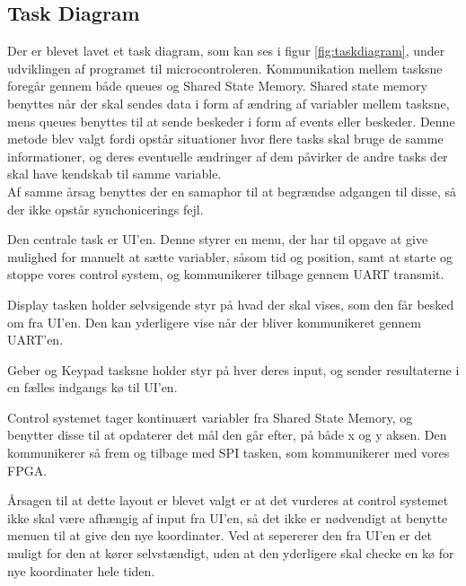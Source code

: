 \subsection{Task Diagram}

Der er blevet lavet et task diagram, som kan ses i figur \ref{fig:taskdiagram}, under udviklingen af programet til microcontroleren. Kommunikation mellem tasksne foregår gennem både queues og Shared State Memory. Shared state memory benyttes når der skal sendes data i form af ændring af variabler mellem tasksne, mens queues benyttes til at sende beskeder i form af events eller beskeder. Denne metode blev valgt fordi opstår situationer hvor flere tasks skal bruge de samme informationer, og deres eventuelle ændringer af dem påvirker de andre tasks der skal have kendskab til samme variable.
\\
Af samme årsag benyttes der en samaphor til at begrændse adgangen til disse, så der ikke opstår synchonicerings fejl.

Den centrale task er UI'en. Denne styrer en menu, der har til opgave at give mulighed for manuelt at sætte variabler, såsom tid og position, samt at starte og stoppe vores control system, og kommunikerer tilbage gennem UART transmit.

Display tasken holder selvsigende styr på hvad der skal vises, som den får besked om fra UI'en. Den kan yderligere vise når der bliver kommunikeret gennem UART'en.

Geber og Keypad tasksne holder styr på hver deres input, og sender resultaterne i en fælles indgangs kø til UI'en.

Control systemet tager kontinuært variabler fra Shared State Memory, og benytter disse til at opdaterer det mål den går efter, på både x og y aksen. Den kommunikerer så frem og tilbage med SPI tasken, som kommunikerer med vores FPGA.

Årsagen til at dette layout er blevet valgt er at det vurderes at control systemet ikke skal være afhængig af input fra UI'en, så det ikke er nødvendigt at benytte menuen til at give den nye koordinater. Ved at sepererer den fra UI'en er det muligt for den at kører selvstændigt, uden at den yderligere skal checke en kø for nye koordinater hele tiden.

